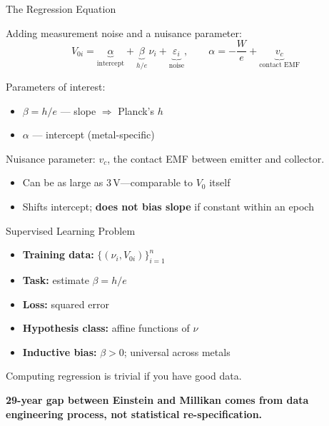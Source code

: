 \documentclass[aspectratio=169]{beamer}
\begin{document}
\begin{frame}{The Regression Equation}

Adding measurement noise and a nuisance parameter:
\[
  V_{0i} = \underbrace{\alpha}_{\text{intercept}} +
            \underbrace{\beta}_{h/e}\,\nu_i +
            \underbrace{\varepsilon_i}_{\text{noise}},
  \qquad
  \alpha = -\frac{W}{e} + \underbrace{v_c}_{\text{contact EMF}}
\]

\medskip
Parameters of interest:
\begin{itemize}
  \item $\beta = h/e$ --- slope $\Rightarrow$ Planck's $h$
  \item $\alpha$ --- intercept (metal-specific)
\end{itemize}

\medskip
Nuisance parameter: $v_c$, the contact EMF between emitter and collector.
\begin{itemize}
  \item Can be as large as 3\,V---comparable to $V_0$ itself
  \item Shifts intercept; \textbf{does not bias slope} if constant within an epoch
  \end{itemize}

\end{frame}

\begin{frame}{Supervised Learning Problem}

\begin{itemize}
  \item \textbf{Training data:} $\{(\nu_i, V_{0i})\}_{i=1}^n$
  \item \textbf{Task:} estimate $\beta = h/e$
  \item \textbf{Loss:} squared error
  \item \textbf{Hypothesis class:} affine functions of $\nu$
  \item \textbf{Inductive bias:} $\beta > 0$; universal across metals
\end{itemize}

\bigskip
Computing  regression is trivial if you have good data.

\bigskip
\textbf{29-year gap between Einstein and Millikan comes from  data engineering process, not statistical
re-specification.}

\end{frame}
\end{document}
